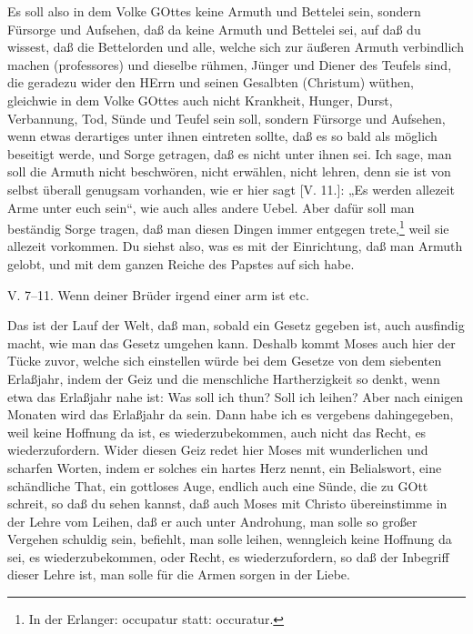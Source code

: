 Es soll also in dem Volke GOttes keine Armuth und Bettelei sein, sondern Fürsorge und Aufsehen, daß da keine Armuth und Bettelei sei, auf daß du wissest, daß die Bettelorden und alle, welche sich zur äußeren Armuth verbindlich machen (professores) und dieselbe rühmen, Jünger und Diener des Teufels sind, die geradezu wider den HErrn und seinen Gesalbten (Christum) wüthen, gleichwie in dem Volke GOttes auch nicht Krankheit, Hunger, Durst, Verbannung, Tod, Sünde und Teufel sein soll, sondern Fürsorge und Aufsehen, wenn etwas derartiges unter ihnen eintreten sollte, daß es so bald als möglich beseitigt werde, und Sorge getragen, daß es nicht unter ihnen sei. Ich sage, man soll die Armuth nicht beschwören, nicht erwählen, nicht lehren, denn sie ist von selbst überall genugsam vorhanden, wie er hier sagt [V. 11.]: „Es werden allezeit Arme unter euch sein“, wie auch alles andere Uebel. Aber dafür soll man beständig Sorge tragen, daß man diesen Dingen immer entgegen trete,\footnote{In der Erlanger: occupatur statt: occuratur.} weil sie allezeit vorkommen. Du siehst also, was es mit der Einrichtung, daß man Armuth gelobt, und mit dem ganzen Reiche des Papstes auf sich habe.

\begin{schriftzitat}
V. 7–11. Wenn deiner Brüder irgend einer arm ist etc.
\end{schriftzitat}

Das ist der Lauf der Welt, daß man, sobald ein Gesetz gegeben ist, auch ausfindig macht,
wie man das Gesetz umgehen kann. Deshalb kommt Moses auch hier der Tücke zuvor, welche sich einstellen würde bei dem Gesetze von dem siebenten Erlaßjahr, indem der Geiz und die menschliche Hartherzigkeit so denkt, wenn etwa das Erlaßjahr nahe ist: Was soll ich thun? Soll ich leihen? Aber nach einigen Monaten wird das Erlaßjahr da sein. Dann habe ich es vergebens dahingegeben, weil keine Hoffnung da ist, es wiederzubekommen, auch nicht das Recht, es wiederzufordern. Wider diesen Geiz redet hier Moses mit wunderlichen und scharfen Worten, indem er solches ein hartes Herz nennt, ein Belialswort, eine schändliche That, ein gottloses Auge, endlich auch eine Sünde, die zu GOtt schreit, so daß du sehen kannst, daß auch Moses mit Christo übereinstimme in der Lehre vom Leihen, daß er auch unter Androhung, man solle so großer Vergehen schuldig sein, befiehlt, man solle leihen, wenngleich keine Hoffnung da sei, es wiederzubekommen, oder Recht, es wiederzufordern, so daß der Inbegriff dieser Lehre ist, man solle für die Armen sorgen in der Liebe.

